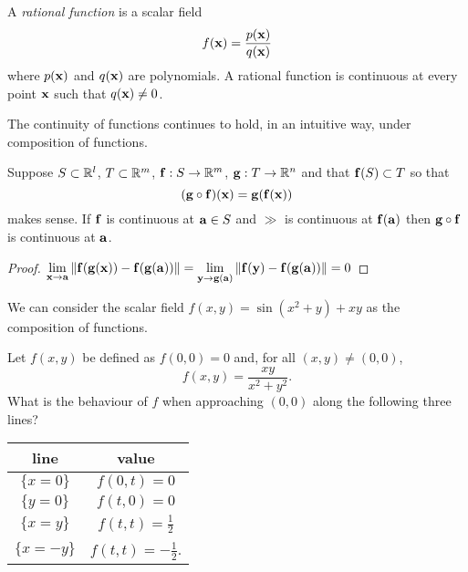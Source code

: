 \begin{example*}
    A  \emph{rational function} is a scalar field
    \[
        f(\xx)=\frac{p(\xx)}{q(\xx)}
    \]
    where \(p(\xx)\) and \(q(\xx)\) are polynomials.
    A rational function is continuous at every point \(\xx\) such that \(q(\xx)\neq 0\).
\end{example*}

The continuity of functions continues to hold, in an intuitive way, under composition of functions.

\begin{theorem}
    Suppose \(S \subset \bR^l\), \(T\subset \bR^m\), \(\ff:S \to \bR^m\), \(\gg : T \to \bR^n\) and that \(\ff(S) \subset T\) so that
    \[(\gg \circ \ff)(\xx) = \gg(\ff(\xx))\]
    makes sense.
    If \(\ff\) is continuous at \(\aa\in S\) and \(\gg\) is continuous at \(\ff(\aa)\) then \(\gg\circ \ff\) is continuous at \(\aa\).
\end{theorem}

\begin{proof}
    \(\displaystyle\lim_{\xx\to\aa}\norm{\ff(\gg(\xx))-\ff(\gg(\aa))}  =\displaystyle\lim_{\yy\to\gg(\aa)}\norm{\ff(\yy)-\ff(\gg(\aa))}  =0   \)
\end{proof}

\begin{example*}
    We can consider the scalar field \(f(x,y)= \sin(x^2 + y) + x y\) as the composition of functions.
\end{example*}



\begin{example*}
    Let \(f(x,y)\) be defined as \(f(0,0)=0\) and, for all \((x,y)\neq (0,0)\),
    \[
        f(x,y) =
        \frac{x y}{x^2 + y^2}.
    \]
    What is the behaviour of \(f\) when approaching \((0,0)\) along the following three lines?
    \begin{center}
        \begin{tabular}{ c | c }
            line         & value                     \\
            \hline
            \(\{x=0\}\)  & \(f(0,t) =  0\)           \\
            \(\{y=0\}\)  & \(f(t,0) = 0\)            \\
            \(\{x=y\}\)  & \(f(t,t) = \frac{1}{2}\)  \\
            \(\{x=-y\}\) & \(f(t,t) =-\frac{1}{2}\).
        \end{tabular}
    \end{center}
\end{example*}



